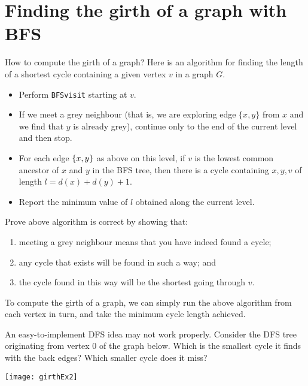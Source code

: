 \section{Finding the girth of a graph with BFS}
How to compute the girth of a graph? Here is an algorithm for finding
the length of a shortest cycle containing a given vertex $v$ in a graph $G$. 
\begin{itemize}
  \item Perform \texttt{BFSvisit} starting at $v$. 
  \item If we meet a grey neighbour 
  (that is, we are exploring edge $\{x, y\}$ from $x$ and we find that $y$ is already grey), 
  continue only to the end of the current level and then stop.
  \item For each edge $\mbox{$\{x, y\}$}$ as above on this level, 
  if $v$ is the lowest common ancestor of $x$ and $y$ in the BFS tree, then there is a cycle
  containing $x, y, v$ of length $l=d(x) + d(y) + 1$. 
  \item Report the minimum value of $l$ obtained along the current level.
\end{itemize}

\begin{Boxample}[7] \label{ex:BFS-cycle} 
Prove above algorithm is correct by showing that:
\begin{enumerate}
\item meeting a grey neighbour means that you have indeed found a cycle;
\item any cycle that exists will be found in such a way; and 
\item the cycle found in this way will be the shortest going through $v$.
\end{enumerate}

\end{Boxample}

To compute the girth of a graph, we can simply run the above algorithm
from each vertex in turn, and take the minimum cycle length achieved.

\begin{Boxample}
An easy-to-implement DFS idea may not work properly. 
Consider the DFS tree originating from vertex $0$ of the graph below. 
Which is the smallest cycle it finds with the back edges? Which smaller cycle does it miss?
\begin{center}
  \texttt{[image: girthEx2]}
\end{center}
\end{Boxample}


